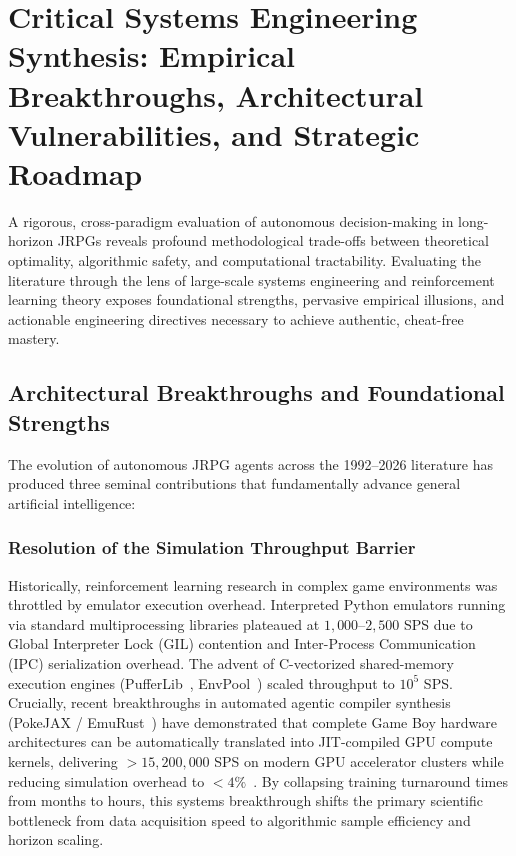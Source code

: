 \documentclass[journal,10pt,twocolumn]{IEEEtran}
\begin{document}
\section{Critical Systems Engineering Synthesis: Empirical Breakthroughs, Architectural Vulnerabilities, and Strategic Roadmap}
\label{sec:critical_synthesis}
A rigorous, cross-paradigm evaluation of autonomous decision-making in long-horizon JRPGs reveals profound methodological trade-offs between theoretical optimality, algorithmic safety, and computational tractability. Evaluating the literature through the lens of large-scale systems engineering and reinforcement learning theory exposes foundational strengths, pervasive empirical illusions, and actionable engineering directives necessary to achieve authentic, cheat-free mastery.

\subsection{Architectural Breakthroughs and Foundational Strengths}
The evolution of autonomous JRPG agents across the 1992--2026 literature has produced three seminal contributions that fundamentally advance general artificial intelligence:

\subsubsection{Resolution of the Simulation Throughput Barrier}
Historically, reinforcement learning research in complex game environments was throttled by emulator execution overhead. Interpreted Python emulators running via standard multiprocessing libraries plateaued at $1{,}000$--$2{,}500$ SPS due to Global Interpreter Lock (GIL) contention and Inter-Process Communication (IPC) serialization overhead. The advent of C-vectorized shared-memory execution engines (PufferLib~\cite{suarez2023pufferlib}, EnvPool~\cite{weng2022envpool}) scaled throughput to $10^5$ SPS. Crucially, recent breakthroughs in automated agentic compiler synthesis (PokeJAX / EmuRust~\cite{karten2026autogen}) have demonstrated that complete Game Boy hardware architectures can be automatically translated into JIT-compiled GPU compute kernels, delivering $>15{,}200{,}000$ SPS on modern GPU accelerator clusters while reducing simulation overhead to $<4\%$~\cite{karten2026autogen}. By collapsing training turnaround times from months to hours, this systems breakthrough shifts the primary scientific bottleneck from data acquisition speed to algorithmic sample efficiency and horizon scaling.
\end{document}
